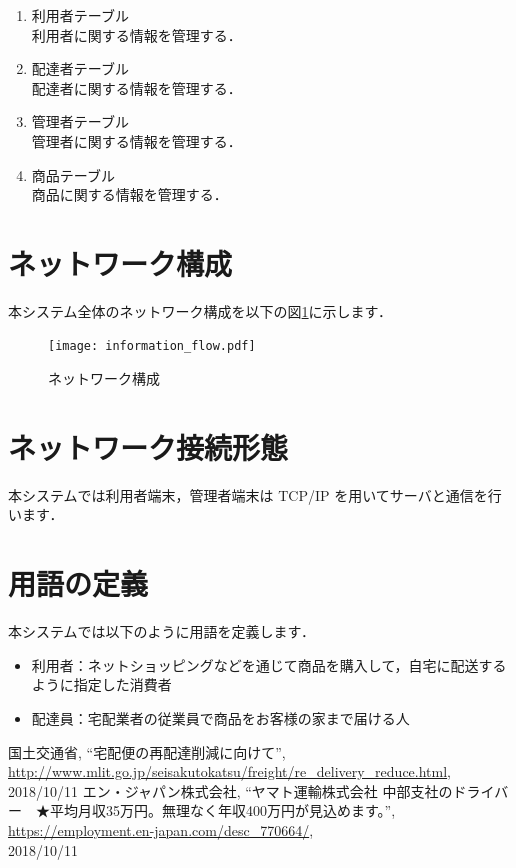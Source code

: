 \documentclass[a4j,titlepage]{jarticle}
\begin{document}
\begin{enumerate}
\item 利用者テーブル\\
  利用者に関する情報を管理する．
\item 配達者テーブル\\
  配達者に関する情報を管理する．
\item 管理者テーブル\\
  管理者に関する情報を管理する．
\item 商品テーブル\\
  商品に関する情報を管理する．
\end{enumerate}

\section{ネットワーク構成}
本システム全体のネットワーク構成を以下の図\ref{fig:i_f}に示します．

\begin{figure}[htbp]
 \begin{center}
  \texttt{[image: information\_flow.pdf]}
	\caption{ネットワーク構成}
	\label{fig:i_f}
 \end{center}

\end{figure}


\section{ネットワーク接続形態}
本システムでは利用者端末，管理者端末は TCP/IP を用いてサーバと通信を行います．


\section{用語の定義}
本システムでは以下のように用語を定義します．
\begin{itemize}
 \item 利用者：ネットショッピングなどを通じて商品を購入して，自宅に配送するように指定した消費者
 \item 配達員：宅配業者の従業員で商品をお客様の家まで届ける人
\end{itemize}

\begin{thebibliography}{9}

国土交通省,
\newblock ``宅配便の再配達削減に向けて'',\\
\newblock \url{http://www.mlit.go.jp/seisakutokatsu/freight/re_delivery_reduce.html}, \\
2018/10/11
エン・ジャパン株式会社,
\newblock ``ヤマト運輸株式会社 中部支社のドライバー　★平均月収35万円。無理なく年収400万円が見込めます。'',\\
\newblock \url{https://employment.en-japan.com/desc_770664/}, \\
2018/10/11
\end{thebibliography}
\end{document}
